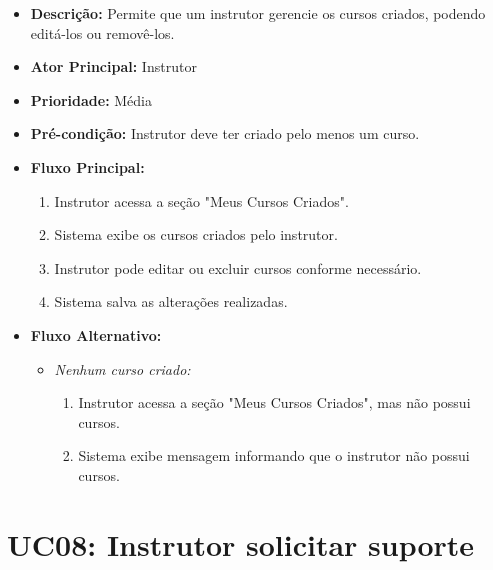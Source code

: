         \begin{itemize}
            \item \textbf{Descrição:} Permite que um instrutor gerencie os cursos criados, podendo editá-los ou removê-los.
            
            \item \textbf{Ator Principal:} Instrutor
            
            \item \textbf{Prioridade:} Média
            
            \item \textbf{Pré-condição:} Instrutor deve ter criado pelo menos um curso.
            
            \item \textbf{Fluxo Principal:}
            \begin{enumerate}
                \item Instrutor acessa a seção "Meus Cursos Criados".
                \item Sistema exibe os cursos criados pelo instrutor.
                \item Instrutor pode editar ou excluir cursos conforme necessário.
                \item Sistema salva as alterações realizadas.
            \end{enumerate}

            \item \textbf{Fluxo Alternativo:}
            \begin{itemize}
                \item \textit{Nenhum curso criado:}
                \begin{enumerate}
                    \item Instrutor acessa a seção "Meus Cursos Criados", mas não possui cursos.
                    \item Sistema exibe mensagem informando que o instrutor não possui cursos.
                \end{enumerate}
            \end{itemize}
        \end{itemize}

        \section*{UC08: Instrutor solicitar suporte}

